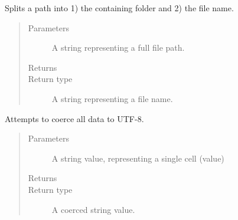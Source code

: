 \documentclass[letterpaper,10pt,english]{sphinxmanual}
\begin{document}
\begin{fulllineitems}
\label{\detokenize{index:ListManagement.utility.general.split_name}}
Splits a path into 1) the containing folder and 2) the file name.
\begin{quote}\begin{description}
\item[{Parameters}] \leavevmode
{} \textendash{} A string representing a full file path.

\item[{Returns}] \leavevmode


\item[{Return type}] \leavevmode
A string representing a file name.

\end{description}\end{quote}

\end{fulllineitems}


\begin{fulllineitems}
\label{\detokenize{index:ListManagement.utility.general.strip_unicode_chars}}
Attempts to coerce all data to UTF-8.
\begin{quote}\begin{description}
\item[{Parameters}] \leavevmode
{} \textendash{} A string value, representing a single cell (value)

\item[{Returns}] \leavevmode


\item[{Return type}] \leavevmode
A coerced string value.

\end{description}\end{quote}

\end{fulllineitems}

\end{document}
